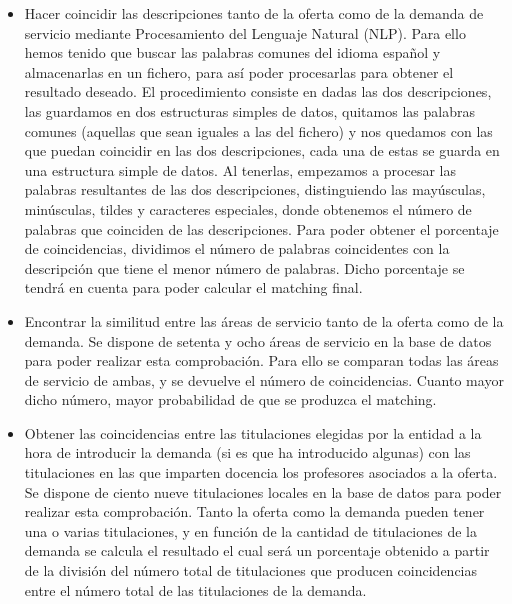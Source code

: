 \documentclass[11pt]{article}
\begin{document}
\begin{itemize} 	
	\item Hacer coincidir las descripciones tanto de la oferta como de la demanda de servicio mediante Procesamiento del Lenguaje Natural (NLP).
	Para ello hemos tenido que buscar las palabras comunes del idioma español y almacenarlas en un fichero, para así poder  procesarlas para obtener el resultado deseado. El procedimiento consiste en dadas las dos descripciones, las guardamos en dos estructuras simples de datos, quitamos las palabras comunes (aquellas que sean iguales a las del fichero) y nos quedamos con las que puedan coincidir en las dos descripciones, cada una de estas se guarda en una estructura simple de datos. Al tenerlas, empezamos a procesar las palabras resultantes de las dos descripciones, distinguiendo las mayúsculas, minúsculas, tildes y caracteres especiales, donde obtenemos el número de palabras que coinciden de las descripciones. Para poder obtener el porcentaje de coincidencias, dividimos el número de palabras coincidentes con la descripción que tiene el menor número de palabras. Dicho porcentaje se tendrá en cuenta para poder calcular el matching final.
	
	\item Encontrar la similitud entre las áreas de servicio tanto de la oferta como de la demanda. Se dispone de setenta y ocho áreas de servicio en la base de datos para poder realizar esta comprobación. Para ello se comparan todas las áreas de servicio de ambas, y se devuelve el número de coincidencias. Cuanto mayor dicho número, mayor probabilidad de que se produzca el matching.
	
	\item Obtener las coincidencias entre las titulaciones elegidas por la entidad a la hora de introducir la demanda (si es que ha introducido algunas) con las titulaciones en las que imparten docencia los profesores asociados a la oferta. 
	Se dispone de ciento nueve titulaciones locales en la base de datos para poder realizar esta comprobación. Tanto la oferta como la demanda pueden tener una o varias titulaciones, y en función de la cantidad de titulaciones de la demanda se calcula el resultado el cual será un porcentaje obtenido a partir de la división del número total de titulaciones que producen coincidencias entre el  número total de las titulaciones de la demanda.
	

\end{itemize}
\end{document}
